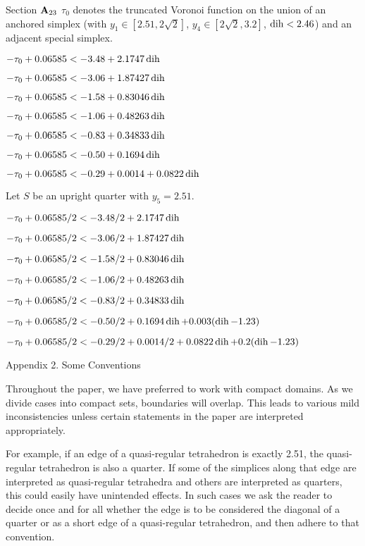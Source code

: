 \subhead Section ${\bold A}_{23}$\endsubhead
$\tau_0$ denotes the truncated Voronoi function
on the union of an anchored simplex 
(with $y_1\in[2.51,2\sqrt2]$, $y_4\in[2\sqrt2,3.2]$, $\operatorname{dih}<2.46$)
and an adjacent special simplex.

 $-\tau_0+0.06585 < -3.48 + 2.1747 \operatorname{dih}$

 $-\tau_0+0.06585  < -3.06 + 1.87427 \operatorname{dih}$

 $-\tau_0+0.06585  < -1.58 + 0.83046 \operatorname{dih}$

 $-\tau_0+0.06585  < -1.06 + 0.48263 \operatorname{dih}$

 $-\tau_0+0.06585  < -0.83 + 0.34833 \operatorname{dih}$

 $-\tau_0+0.06585  < -0.50 + 0.1694 \operatorname{dih}$

 $-\tau_0+0.06585  < -0.29 +0.0014 + 0.0822 \operatorname{dih}$

Let $S$ be an upright quarter with $y_5=2.51$.

 $-\tau_0+0.06585/2 < -3.48/2 + 2.1747 \operatorname{dih}$

 $-\tau_0+0.06585/2  < -3.06/2 + 1.87427 \operatorname{dih}$

 $-\tau_0+0.06585/2  < -1.58/2 + 0.83046 \operatorname{dih}$

 $-\tau_0+0.06585/2  < -1.06/2 + 0.48263 \operatorname{dih}$

 $-\tau_0+0.06585/2  < -0.83/2 + 0.34833 \operatorname{dih}$

 $-\tau_0+0.06585/2  < -0.50/2 + 0.1694 \operatorname{dih}+0.003(\operatorname{dih}-1.23)$

 $-\tau_0+0.06585/2  < -0.29/2 +0.0014/2 + 0.0822 \operatorname{dih} +0.2(\operatorname{dih}-1.23)$

\vfill\eject
\head Appendix 2. Some Conventions\endhead

\parindent=10pt

Throughout the paper, we have preferred to work with
compact domains.  As we divide cases into
compact sets, boundaries will overlap.
This leads to various mild inconsistencies unless certain
statements in the paper are interpreted appropriately.

For example, if an edge of a quasi-regular tetrahedron
is exactly 2.51, the quasi-regular tetrahedron is also
a quarter.  If some of the simplices along that edge are
interpreted as quasi-regular tetrahedra and others are
interpreted as quarters, this could easily have unintended
effects.  In such cases we ask the reader to decide once
and for all whether the edge is to be considered the diagonal
of a quarter or as a short edge of a quasi-regular tetrahedron,
and then adhere to that convention.

